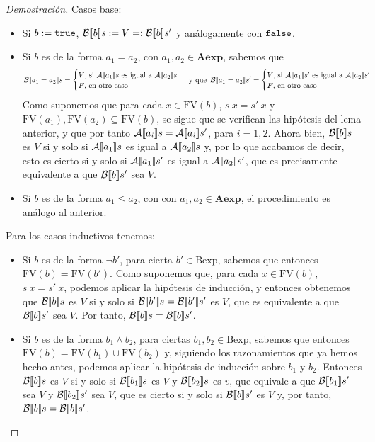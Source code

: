 \begin{proof}[Demostración]
Casos base:
\begin{itemize}
    \item Si $b := \texttt{true}$, $\mathcal{B}[\![b]\!]s := V =: \mathcal{B}[\![b]\!]s'$ y análogamente con $\texttt{false}$.
    \item Si $b$ es de la forma $a_1 = a_2$, con $a_1, a_2 \in \mathbf{Aexp}$, sabemos que
$$\fc{B}{a_1 = a_2}s  = \begin{cases} V\text{, si }\fc{A}{a_1}s\text{ es igual a } \fc{A}{a_2}s \\ F\text{, en otro caso}\end{cases} \text{ y que }\, \fc{B}{a_1 = a_2}s' = \begin{cases} V\text{, si }\fc{A}{a_1}s'\text{ es igual a } \fc{A}{a_2}s' \\ F\text{, en otro caso}\end{cases}$$
Como suponemos que para cada $x \in \mathrm{FV}(b)$, $s\ x = s'\ x$ y $\mathrm{FV}(a_1), \mathrm{FV}(a_2) \subseteq \mathrm{FV}(b)$, se sigue que se verifican las hipótesis del lema anterior, y que por tanto $\mathcal{A}[\![a_i]\!]s = \mathcal{A}[\![a_i]\!]s'$, para $i = 1, 2$. Ahora bien, $\mathcal{B}[\![b]\!]s$ es $V$ si y solo si $\mathcal{A}[\![a_1]\!]s$ es igual a $\mathcal{A}[\![a_2]\!]s$ y, por lo que acabamos de decir, esto es cierto si y solo si $\mathcal{A}[\![a_1]\!]s'$ es igual a $\mathcal{A}[\![a_2]\!]s'$, que es precisamente equivalente a que $\mathcal{B}[\![b]\!]s'$ sea $V$.
    \item Si $b$ es de la forma $a_1 \leq a_2$, con con $a_1, a_2 \in \mathbf{Aexp}$, el procedimiento es análogo al anterior.
\end{itemize}

Para los casos inductivos tenemos:
\begin{itemize}
    \item Si $b$ es de la forma $\neg b'$, para cierta $b' \in \mathrm{Bexp}$, sabemos que entonces $\mathrm{FV}(b) = \mathrm{FV}(b')$. Como suponemos que, para cada $x \in \mathrm{FV}(b)$, $s\ x = s' \ x$, podemos aplicar la hipótesis de inducción, y entonces obtenemos que $\mathcal{B}[\![b]\!]s$ es $V$ si y solo si $\mathcal{B}[\![b']\!]s = \mathcal{B}[\![b']\!]s'$ es $V$, que es equivalente a que $\mathcal{B}[\![b]\!]s'$ sea $V$. Por tanto, $\mathcal{B}[\![b]\!]s = \mathcal{B}[\![b]\!]s'$.
    \item Si $b$ es de la forma $b_1 \land b_2$, para ciertas $b_1, b_2 \in \mathrm{Bexp}$, sabemos que entonces $\mathrm{FV}(b) =  \mathrm{FV}(b_1)\cup\mathrm{FV}(b_2)$ y, siguiendo los razonamientos que ya hemos hecho antes, podemos aplicar la hipótesis de inducción sobre $b_1$ y $b_2$. Entonces $\mathcal{B}[\![b]\!]s$ es $V$ si y solo si $\mathcal{B}[\![b_1]\!]s$ es $V$ y $\mathcal{B}[\![b_2]\!]s$ es $v$, que equivale a que $\mathcal{B}[\![b_1]\!]s'$ sea $V$ y $\mathcal{B}[\![b_2]\!]s'$ sea $V$, que es cierto si y solo si $\mathcal{B}[\![b]\!]s'$ es $V$ y, por tanto, $\mathcal{B}[\![b]\!]s = \mathcal{B}[\![b]\!]s'$.
\end{itemize}
\end{proof}

